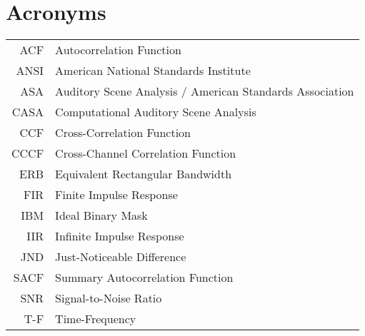 \documentclass[english,bachelor,unicode]{ctufit-thesis}
\theoremstyle{plain}
\theoremstyle{definition}
\theoremstyle{remark}
\numberwithin{theorem}{chapter}
\begin{document}
	\printabstractpage
	
	
	\chapter{Acronyms} %
	\begin{tabular}{rl}
		ACF & Autocorrelation Function\\
		ANSI & American National Standards Institute\\
		ASA & Auditory Scene Analysis / American Standards Association\\
		CASA & Computational Auditory Scene Analysis\\
		CCF & Cross-Correlation Function\\
		CCCF & Cross-Channel Correlation Function\\
		ERB & Equivalent Rectangular Bandwidth\\
		FIR & Finite Impulse Response\\
		IBM & Ideal Binary Mask\\
		IIR & Infinite Impulse Response\\
		JND & Just-Noticeable Difference\\
		SACF & Summary Autocorrelation Function\\
		SNR & Signal-to-Noise Ratio\\
		T-F & Time-Frequency
	\end{tabular}
	
\end{document}
